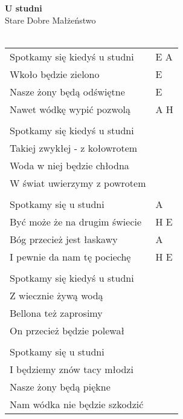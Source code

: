 \documentclass[a5paper]{article}
\begin{document}


\noindent
\fontsize{12pt}{15pt}\selectfont
\textbf{U studni} \\
\fontsize{8pt}{10pt}\selectfont
Stare Dobre Małżeństwo \\ \\
\fontsize{10pt}{12pt}\selectfont
{}
\begin{tabular}{@{}p{6.50cm}p{3cm}@{}}
\noindent
Spotkamy się kiedyś u studni & E A \\
Wkoło będzie zielono & E \\
Nasze żony będą odświętne & E \\
Nawet wódkę wypić pozwolą & A H \\ \\

Spotkamy się kiedyś u studni \\
Takiej zwykłej - z kołowrotem \\
Woda w niej będzie chłodna \\
W świat uwierzymy z powrotem \\ \\

Spotkamy się u studni & A \\
Być może że na drugim świecie & H E \\
Bóg przecież jest łaskawy & A \\
I pewnie da nam tę pociechę & H E \\ \\

Spotkamy się kiedyś u studni \\
Z wiecznie żywą wodą \\
Bellona też zaprosimy \\
On przecież będzie polewał \\\\

Spotkamy się u studni \\
I będziemy znów tacy młodzi \\
Nasze żony będą piękne \\
Nam wódka nie będzie szkodzić 
\end{tabular}
\end{document}
